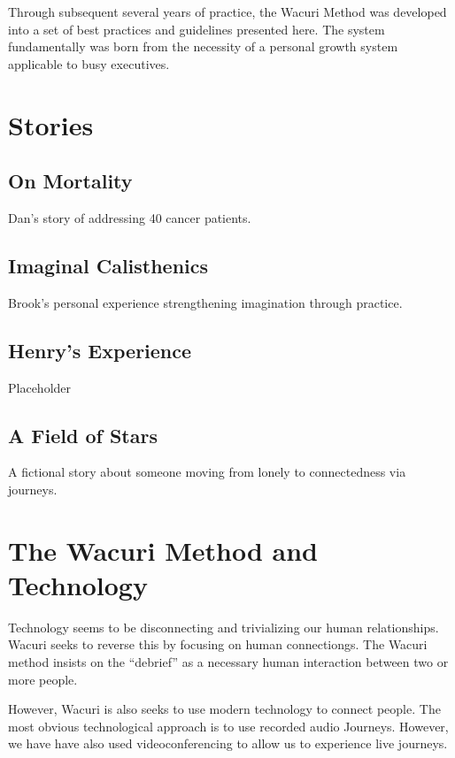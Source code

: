\documentclass[12pt]{book}
\begin{document}
Through subsequent several years of practice, the Wacuri Method was developed into a set of best practices and guidelines presented here. The system fundamentally was born from the necessity of a personal growth system applicable to busy executives.
				
			
	

\chapter{Stories}

\section{On Mortality}

Dan's story of addressing 40 cancer patients.

\section{Imaginal Calisthenics}

Brook's personal experience strengthening imagination through practice.

\section{Henry's Experience}

Placeholder 

\section{A Field of Stars}

A fictional story about someone moving from lonely to connectedness via journeys.
\chapter{The Wacuri Method and Technology}

Technology seems to be disconnecting and trivializing our human relationships.
Wacuri seeks to reverse this by focusing on human connectiongs. The Wacuri method
insists on the ``debrief'' as a necessary human interaction between two or more people.

However, Wacuri is also seeks to use modern technology to connect people.
The most obvious technological approach is to use recorded audio Journeys.
However, we have have also used videoconferencing to allow us to experience live journeys.
\end{document}
